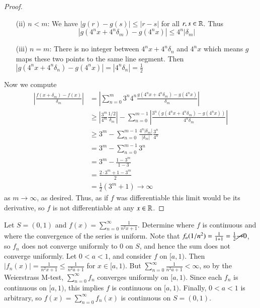 \begin{proof}
\begin{itemize}
        \item[(ii)] $n < m$: We have $|g(r) - g(s)| \leq |r-s|$ for all $r,s \in \mathbb R$. Thus $$|g(4^nx+4^n\delta_m) - g(4^nx)| \leq 4^n|\delta_m|$$
        \item[(iii)] $n=m$: There is no integer between $4^nx+4^n\delta_n$ and $4^nx$ which means $g$ maps these two points to the same line segment. Then $|g(4^nx+4^n\delta_n) - g(4^nx)| = |4^n\delta_n| = \frac{1}{2}$
    \end{itemize}
    Now we compute \begin{align*}
        \left|\frac{f(x+\delta_m)-f(x)}{\delta_m}\right| &= \left|\sum_{n=0}^m{3^n}{4^n}\frac{g(4^nx+4^n\delta_m) - g(4^nx)}{\delta_m}\right| \\
        &\geq \left|\frac{3^m}{4^m}\frac{1/2}{\delta_m}\right| -\sum_{n=0}^{m-1}\left|\frac{3^n(g(4^nx+4^n\delta_m) - g(4^nx))}{4^n\delta_m}\right| \\
        &\geq 3^m - \sum_{n=0}^{m-1}\frac{4^n|\delta_m|}{|\delta_m|}\frac{3^n}{4^n} \\
        &= 3^m - \sum_{n=0}^{m-1}3^n \\
        &= 3^m - \frac{1-3^m}{1-3} \\
        &= \frac{2\cdot3^m+1-3^m}{2} \\
        &= \frac{1}{2}(3^m+1)\rightarrow \infty
    \end{align*}
    as $m\rightarrow \infty$, as desired. Thus, as if $f$ was differentiable this limit would be its derivative, so $f$ is not differentiable at any $x \in \mathbb R$.
\end{proof}

\begin{eg}
    Let $S = (0,1)$ and $f(x) = \sum_{n=0}^{\infty}\frac{1}{n^2x+1}$. Determine where $f$ is continuous and where the convergence of the series is uniform. Note that $f_n(1/n^2) = \frac{1}{1+1} = \frac{1}{2}\cancel{\rightarrow} 0$, so $f_n$ does not converge uniformly to $0$ on $S$, and hence the sum does not converge uniformly. Let $0 < a < 1$, and consider $f$ on $[a,1)$. Then $|f_n(x)| = \frac{1}{n^2x+1} \leq \frac{1}{n^2a+1}$ for $x \in [a,1)$. But $\sum_{n=0}^{\infty}\frac{1}{n^2a+1} < \infty$, so by the Weierstrass M-test, $\sum_{n=0}^{\infty}f_n$ converges uniformly on $[a,1)$. Since each $f_n$ is continuous on $[a,1)$, this implies $f$ is continuous on $[a,1)$. Finally, $0 < a < 1$ is arbitrary, so $f(x) = \sum_{n=0}^{\infty}f_n(x)$ is continuous on $S = (0,1)$.
\end{eg}


